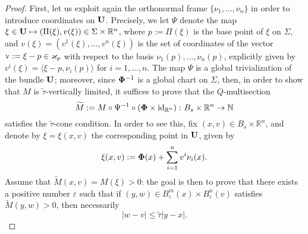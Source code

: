 \documentclass[a4paper,11pt,reqno]{amsart}
\theoremstyle{definition}
\numberwithin{equation}{section}
\numberwithin{subsection}{section}
\newcommand{\N}{\mathbb{N}}
\newcommand{\R}{\mathbb{R}}
\begin{document}
\begin{proof}
First, let us exploit again the orthonormal frame $\lbrace \nu_{1}, \dots, \nu_{n} \rbrace$ in order to introduce coordinates on ${\bf U}$. Precisely, we let $\Psi$ denote the map $\xi \in {\bf U} \mapsto \left( \Pi(\xi), v(\xi) \right) \in \Sigma \times \R^n$, where $p := \Pi(\xi)$ is the base point of $\xi$ on $\Sigma$, and $v(\xi) = \left( v^{1}(\xi), \dots, v^{n}(\xi) \right)$ is the set of coordinates of the vector ${\rm v} := \xi - p \in \varkappa_p$ with respect to the basis $\nu_{1}(p), \dots, \nu_{n}(p)$, explicitly given by $v^{i}(\xi) = \langle \xi - p, \nu_{i}(p) \rangle$ for $i = 1,\dots,n$. The map $\Psi$ is a global trivialization of the bundle ${\bf U}$; moreover, since ${\bf \Phi}^{-1}$ is a global chart on $\Sigma$, then, in order to show that $M$ is $\tilde{\tau}$-vertically limited, it suffices to prove that the $Q$-multisection
\[
\widetilde{M} := M \circ \Psi^{-1} \circ \left( {\bf \Phi} \times {\rm id}_{\R^n} \right) \colon B_{s} \times \R^n \to \N
\] 
satisfies the $\tilde{\tau}$-cone condition. In order to see this, fix $\left( x,v \right) \in B_{s} \times \R^n$, and denote by $\xi = \xi(x,v)$ the corresponding point in ${\bf U}$, given by
\begin{equation} \label{vl:1}
\xi(x,v) := {\bf \Phi}(x) + \sum_{i=1}^{n} v^{i} \nu_{i}(x).
\end{equation}
Assume that $\widetilde{M}(x,v) = M(\xi) > 0$: the goal is then to prove that there exists a positive number $\varepsilon$ such that if $(y,w) \in B^{m}_{\varepsilon}(x) \times B^{n}_{\varepsilon}(v)$ satisfies $\widetilde{M}(y,w) > 0$, then necessarily
\begin{equation} \label{vl:2}
|w - v| \leq \tilde{\tau} |y - x|.
\end{equation}


\end{proof}
\end{document}
